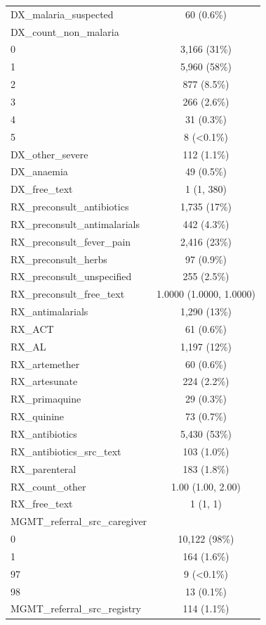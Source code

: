 \documentclass[
  letterpaper,
  DIV=11,
  numbers=noendperiod]{scrreprt}
\begin{document}
\begin{longtable}[]{@{}lc@{}}
DX\_malaria\_suspected & 60 (0.6\%) \\
DX\_count\_non\_malaria & \\
0 & 3,166 (31\%) \\
1 & 5,960 (58\%) \\
2 & 877 (8.5\%) \\
3 & 266 (2.6\%) \\
4 & 31 (0.3\%) \\
5 & 8 (\textless0.1\%) \\
DX\_other\_severe & 112 (1.1\%) \\
DX\_anaemia & 49 (0.5\%) \\
DX\_free\_text & 1 (1, 380) \\
RX\_preconsult\_antibiotics & 1,735 (17\%) \\
RX\_preconsult\_antimalarials & 442 (4.3\%) \\
RX\_preconsult\_fever\_pain & 2,416 (23\%) \\
RX\_preconsult\_herbs & 97 (0.9\%) \\
RX\_preconsult\_unspecified & 255 (2.5\%) \\
RX\_preconsult\_free\_text & 1.0000 (1.0000, 1.0000) \\
RX\_antimalarials & 1,290 (13\%) \\
RX\_ACT & 61 (0.6\%) \\
RX\_AL & 1,197 (12\%) \\
RX\_artemether & 60 (0.6\%) \\
RX\_artesunate & 224 (2.2\%) \\
RX\_primaquine & 29 (0.3\%) \\
RX\_quinine & 73 (0.7\%) \\
RX\_antibiotics & 5,430 (53\%) \\
RX\_antibiotics\_src\_text & 103 (1.0\%) \\
RX\_parenteral & 183 (1.8\%) \\
RX\_count\_other & 1.00 (1.00, 2.00) \\
RX\_free\_text & 1 (1, 1) \\
MGMT\_referral\_src\_caregiver & \\
0 & 10,122 (98\%) \\
1 & 164 (1.6\%) \\
97 & 9 (\textless0.1\%) \\
98 & 13 (0.1\%) \\
MGMT\_referral\_src\_registry & 114 (1.1\%) \\
\bottomrule()
\end{longtable}
\end{document}
